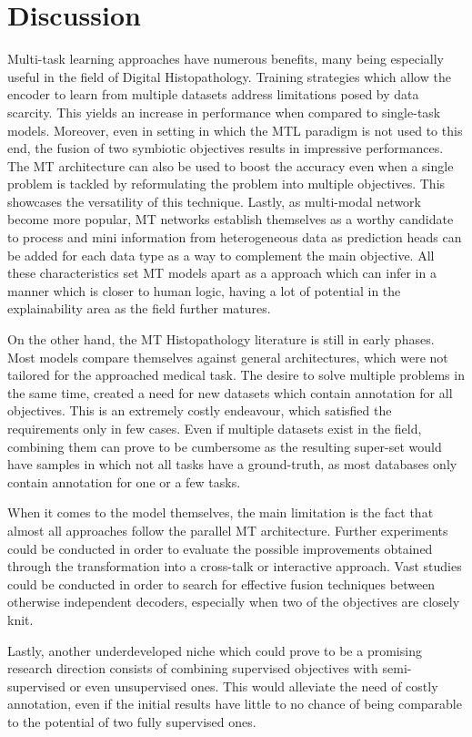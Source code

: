 \chapter{Discussion}
\label{chapter:Discussion}

Multi-task learning approaches have numerous benefits, many being especially useful in the field of Digital Histopathology. Training strategies which allow the encoder to learn from multiple datasets address limitations posed by data scarcity. This yields an increase in performance when compared to single-task models. Moreover, even in setting in which the MTL paradigm is not used to this end, the fusion of two symbiotic objectives results in impressive performances. The MT architecture can also be used to boost the accuracy even when a single problem is tackled by reformulating the problem into multiple objectives. This showcases the versatility of this technique. Lastly, as multi-modal network become more popular, MT networks establish themselves as a worthy candidate to process and mini information from heterogeneous data as prediction heads can be added for each data type as a way to complement the main objective. All these characteristics set MT models apart as a approach which can infer in a manner which is closer to human logic, having a lot of potential in the explainability area as the field further matures. 

On the other hand, the MT Histopathology literature is still in early phases. Most models compare themselves against general architectures, which were not tailored for the approached medical task. The desire to solve multiple problems in the same time, created a need for new datasets which contain annotation for all objectives. This is an extremely costly endeavour, which satisfied the requirements only in few cases. Even if multiple datasets exist in the field, combining them can prove to be cumbersome as the resulting super-set would have samples in which not all tasks have a ground-truth, as most databases only contain annotation for one or a few tasks. 

When it comes to the model themselves, the main limitation is the fact that almost all approaches follow the parallel MT architecture. Further experiments could be conducted in order to evaluate the possible improvements obtained through the transformation into a cross-talk or interactive approach. Vast studies could be conducted in order to search for effective fusion techniques between otherwise independent decoders, especially when two of the objectives are closely knit. 

Lastly, another underdeveloped niche which could prove to be a promising research direction consists of combining supervised objectives with semi-supervised or even unsupervised ones. This would alleviate the need of costly annotation, even if the initial results have little to no chance of being comparable to the potential of two fully supervised ones.